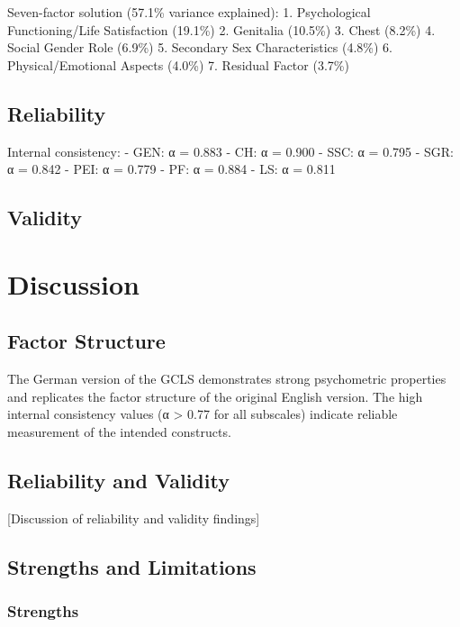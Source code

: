 \documentclass[
  english,
  man]{apa6}
\begin{document}
Seven-factor solution (57.1\% variance explained):
1. Psychological Functioning/Life Satisfaction (19.1\%)
2. Genitalia (10.5\%)
3. Chest (8.2\%)
4. Social Gender Role (6.9\%)
5. Secondary Sex Characteristics (4.8\%)
6. Physical/Emotional Aspects (4.0\%)
7. Residual Factor (3.7\%)

\subsection{Reliability}\label{reliability}

Internal consistency:
- GEN: α = 0.883
- CH: α = 0.900
- SSC: α = 0.795
- SGR: α = 0.842
- PEI: α = 0.779
- PF: α = 0.884
- LS: α = 0.811

\subsection{Validity}\label{validity}

\section{Discussion}\label{discussion}

\subsection{Factor Structure}\label{factor-structure}

The German version of the GCLS demonstrates strong psychometric properties and replicates the factor structure of the original English version. The high internal consistency values (α \textgreater{} 0.77 for all subscales) indicate reliable measurement of the intended constructs.

\subsection{Reliability and Validity}\label{reliability-and-validity}

{[}Discussion of reliability and validity findings{]}

\subsection{Strengths and Limitations}\label{strengths-and-limitations}

\subsubsection{Strengths}\label{strengths}
\end{document}
